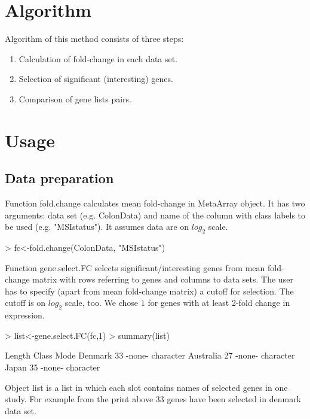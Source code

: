 \documentclass[a4paper]{report}
\begin{document}
\section*{Algorithm}
Algorithm of this method consists of three steps:
\begin{enumerate}
\item Calculation of fold-change in each data set.
\item Selection of significant (interesting) genes.
\item Comparison of gene lists pairs.
\end{enumerate}

\section*{Usage}
\subsection*{Data preparation}
Function {\ttfamily fold.change} calculates mean fold-change in MetaArray object. It has two arguments: data set (e.g. {\ttfamily ColonData}) and name of the column with class labels to be used (e.g. {\ttfamily "MSIstatus"}). It assumes data are on $log_2$ scale.
\begin{Schunk}
\begin{Sinput}
> fc<-fold.change(ColonData, "MSIstatus")
\end{Sinput}
\end{Schunk}
Function {\ttfamily gene.select.FC} selects significant/interesting genes from mean fold-change matrix with rows referring  to genes and columns to data sets. The user has to specify (apart from mean fold-change matrix) a cutoff for selection. The cutoff is on $log_2$ scale, too. We chose $1$ for genes with at least 2-fold change in expression.
\begin{Schunk}
\begin{Sinput}
> list<-gene.select.FC(fc,1)
> summary(list)
\end{Sinput}
\begin{Soutput}
          Length Class  Mode     
Denmark   33     -none- character
Australia 27     -none- character
Japan     35     -none- character
\end{Soutput}
\end{Schunk}
Object {\ttfamily list} is a list in which each slot contains names of selected genes in one study. For example from the print above 33 genes have been selected in {\ttfamily denmark} data set. 
\end{document}
